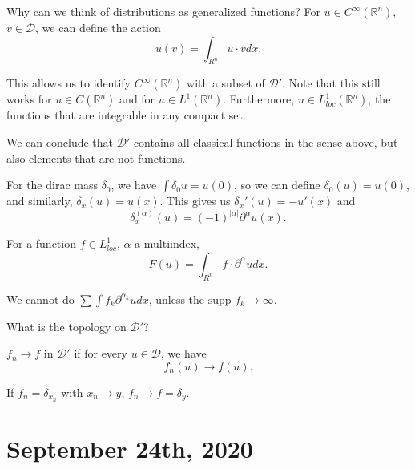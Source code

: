 \documentclass[12pt]{scrartcl}
\newcommand{\R}{\mathbb{R}}
\newcommand{\supp}{\text{supp }}
\begin{document}
Why can we think of distributions as generalized functions?  For $u \in C^{\infty}(\R^n)$, $v \in \mathcal D$, we can define the action
$$u(v) = \int_{R^n} u\cdot v dx.$$

This allows us to identify $C^{\infty}(\R^n)$ with a subset of $\mathcal D'$.  Note that this still works for $u \in C(\R^n)$ and for $u \in L^1(\R^n)$.  Furthermore, $u \in L_{loc}^1(\R^n)$, the functions that are integrable in any compact set.

We can conclude that $\mathcal D'$ contains all classical functions in the sense above, but also elements that are not functions.

\begin{example} For the dirac mass $\delta_0$, we have $\int \delta_0 u = u(0)$, so we can define $\delta_0(u) = u(0)$, and similarly, $\delta_x(u) = u(x)$.  This gives us $\delta_x'(u) = -u'(x)$ and 
$$\delta_x^(\alpha)(u) = (-1)^{|\alpha|}\partial^{\alpha} u(x).$$
\end{example}

\begin{example} For a function $f \in L_{loc}^1$, $\alpha$ a multiindex,
$$F(u) = \int_{R^n} f \cdot \partial^{\alpha} u dx.$$

We cannot do $\sum \int f_k \partial^{\alpha_k} u dx$, unless the $\supp f_k \rightarrow \infty$.
\end{example}

What is the topology on $\mathcal D'$?  
\begin{definition} $f_n \rightarrow f$ in $\mathcal D'$ if for every $u \in \mathcal D$, we have 
$$f_n(u) \rightarrow f(u).$$
\end{definition}
\begin{example} If $f_n = \delta_{x_n}$ with $x_n \rightarrow y$, $f_n \rightarrow f = \delta_y$. 
\end{example}
\pagebreak
\section{September 24th, 2020}
\end{document}
